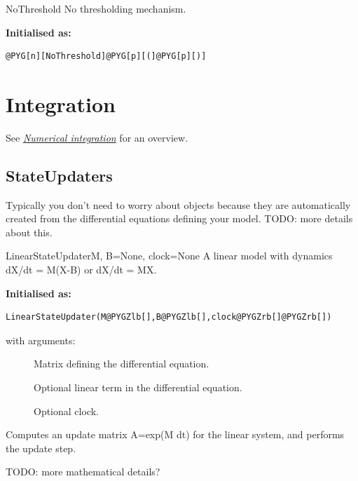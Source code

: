 \documentclass[letterpaper,10pt,english]{manual}
\begin{document}
\hypertarget{brian.NoThreshold}{}\begin{classdesc}{NoThreshold}{}
No thresholding mechanism.

\textbf{Initialised as:}

\begin{Verbatim}[commandchars=@\[\]]
@PYG[n][NoThreshold]@PYG[p][(]@PYG[p][)]
\end{Verbatim}
\end{classdesc}

\resetcurrentobjects
\hypertarget{--doc-reference-integration}{}

\hypertarget{integration}{}\section{Integration}

See \hyperlink{numerical-integration}{\emph{Numerical integration}} for an overview.


\subsection{StateUpdaters}

Typically you don't need to worry about  objects
because they are automatically created from the differential
equations defining your model. TODO: more details about this.

\hypertarget{brian.LinearStateUpdater}{}\begin{classdesc}{LinearStateUpdater}{M, B=None, clock=None}
A linear model with dynamics dX/dt = M(X-B) or dX/dt = MX.

\textbf{Initialised as:}

\begin{Verbatim}[commandchars=@\[\]]
LinearStateUpdater(M@PYGZlb[],B@PYGZlb[],clock@PYGZrb[]@PYGZrb[])
\end{Verbatim}

with arguments:
\begin{description}
\item[] \leavevmode
Matrix defining the differential equation.

\item[] \leavevmode
Optional linear term in the differential equation.

\item[] \leavevmode
Optional clock.

\end{description}

Computes an update matrix A=exp(M dt) for the linear system,
and performs the update step.

TODO: more mathematical details?
\end{classdesc}
\end{document}
